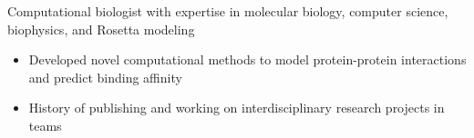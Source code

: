 
Computational biologist with expertise in molecular biology, computer science, biophysics, and Rosetta modeling
\begin{itemize}
\item Developed novel computational methods to model protein-protein interactions and predict binding affinity
\item History of publishing and working on interdisciplinary research projects in teams
\end{itemize}
